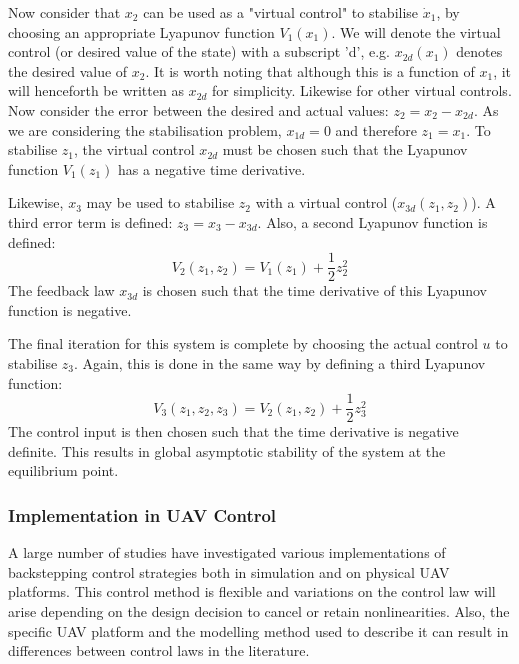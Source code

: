 Now consider that $x_{2}$ can be used as a "virtual control" to stabilise $\dot{x}_{1}$, by choosing an appropriate Lyapunov function $V_{1}(x_{1})$. We will denote the virtual control (or desired value of the state) with a subscript 'd', e.g. $x_{2d}(x_{1})$ denotes the desired value of $x_{2}$. It is worth noting that although this is a function of $x_{1}$, it will henceforth be written as $x_{2d}$ for simplicity. Likewise for other virtual controls.  Now consider the error between the desired and actual values: $z_{2}=x_{2}-x_{2d}$. As we are considering the stabilisation problem, $x_{1d}=0$ and therefore $z_{1}=x_{1}$. To stabilise $z_{1}$, the virtual control $x_{2d}$ must be chosen such that the Lyapunov function $V_{1}(z_{1})$ has a negative time derivative.

Likewise, $x_{3}$ may be used to stabilise $z_{2}$ with a virtual control ($x_{3d}(z_{1},z_{2})$). A third error term is defined: $z_{3}=x_{3}-x_{3d}$. Also, a second Lyapunov function is defined: 
\begin{equation*}
V_{2}(z_{1},z_{2})=V_{1}(z_{1})+\frac{1}{2}z_{2}^{2}
\end{equation*}
The feedback law $x_{3d}$ is chosen such that the time derivative of this Lyapunov function is negative. 

The final iteration for this system is complete by choosing the actual control $u$ to stabilise $z_{3}$. Again, this is done in the same way by defining a third Lyapunov function:
\begin{equation*}
V_{3}(z_{1},z_{2},z_{3})=V_{2}(z_{1},z_{2})+\frac{1}{2}z_{3}^{2}
\end{equation*}
The control input is then chosen such that the time derivative is negative definite. This results in global asymptotic stability of the system at the equilibrium point.


\subsubsection{Implementation in UAV Control}

A large number of studies have investigated various implementations of backstepping control strategies both in simulation and on physical UAV platforms. This control method is flexible and variations on the control law will arise depending on the design decision to cancel or retain nonlinearities. Also, the specific UAV platform and the modelling method used to describe it can result in differences between control laws in the literature.

